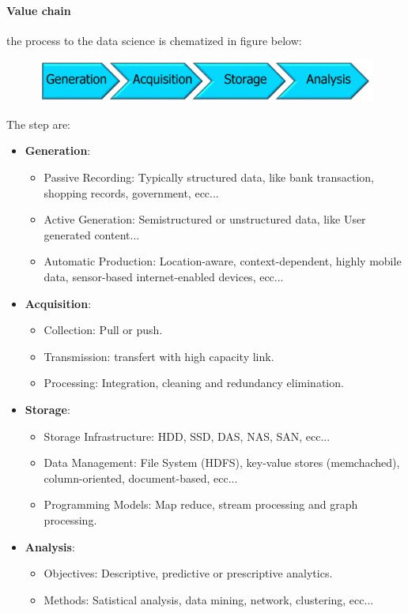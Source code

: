 \documentclass[12pt]{article}
\begin{document}
\paragraph{Value chain} the process to the data science is chematized in figure below:
\begin{figure}[H]
  \includegraphics[width=\linewidth]{images/chain.png}
  \label{fig:chain}
\end{figure}
\noindent The step are:
\begin{itemize}
  \item \textbf{Generation}:
  \begin{itemize}
    \item Passive Recording: Typically structured data, like bank transaction, shopping records, government, ecc...
    \item Active Generation: Semistructured or unstructured data, like User generated content...
    \item Automatic Production: Location-aware, context-dependent, highly mobile data, sensor-based internet-enabled devices, ecc...
  \end{itemize}
  \item \textbf{Acquisition}:
  \begin{itemize}
    \item Collection: Pull or push.
    \item Transmission: transfert with high capacity link.
    \item Processing: Integration, cleaning  and redundancy elimination.
  \end{itemize}
  \item \textbf{Storage}:
  \begin{itemize}
    \item Storage Infrastructure: HDD, SSD, DAS, NAS, SAN, ecc...
    \item Data Management: File System (HDFS), key-value stores (memchached), column-oriented, document-based, ecc...
    \item Programming Models: Map reduce, stream processing and graph processing.
  \end{itemize}
  \item \textbf{Analysis}:
  \begin{itemize}
    \item Objectives: Descriptive, predictive or prescriptive analytics.
    \item Methods: Satistical analysis, data mining, network, clustering, ecc...
  \end{itemize}
\end{itemize}
\end{document}
